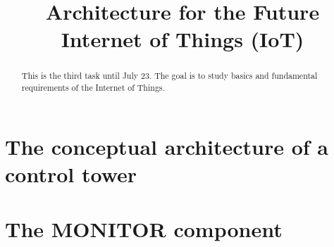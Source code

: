 \documentclass{llncs} %
\begin{document}
\title{Architecture for the Future Internet of Things (IoT)}
 

\maketitle

\begin{abstract}
This is the third  task until July 23.
The goal is to study basics and fundamental requirements of the Internet of Things.
\end{abstract}

\section{The conceptual architecture of a control tower}

\section{The MONITOR component}







\end{document}
